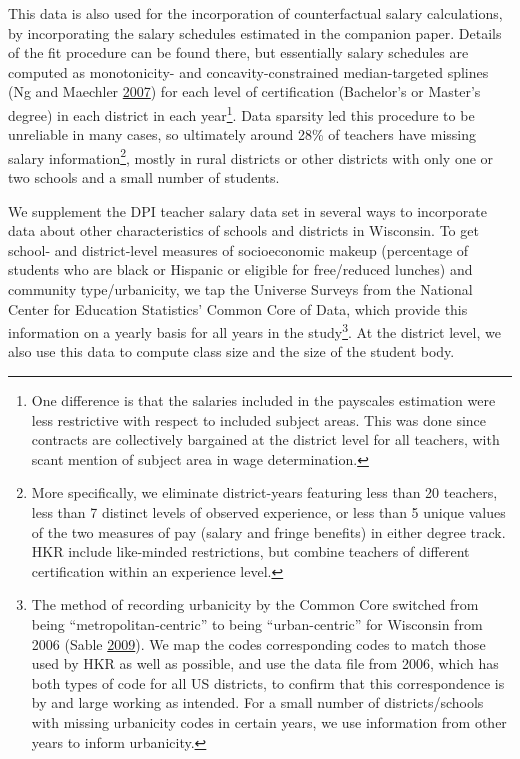 \documentclass[12pt,]{article}
\let\rmarkdownfootnote\footnote%
\def\footnote{\protect\rmarkdownfootnote}
\begin{document}
This data is also used for the incorporation of counterfactual salary
calculations, by incorporating the salary schedules estimated in the
companion paper. Details of the fit procedure can be found there, but
essentially salary schedules are computed as monotonicity- and
concavity-constrained median-targeted splines (Ng and Maechler
\protect\hyperlink{ref-ng}{2007}) for each level of certification
(Bachelor's or Master's degree) in each district in each year\footnote{One
  difference is that the salaries included in the payscales estimation
  were less restrictive with respect to included subject areas. This was
  done since contracts are collectively bargained at the district level
  for all teachers, with scant mention of subject area in wage
  determination.}. Data sparsity led this procedure to be unreliable in
many cases, so ultimately around 28\% of teachers have missing salary
information\footnote{More specifically, we eliminate district-years
  featuring less than 20 teachers, less than 7 distinct levels of
  observed experience, or less than 5 unique values of the two measures
  of pay (salary and fringe benefits) in either degree track. HKR
  include like-minded restrictions, but combine teachers of different
  certification within an experience level.}, mostly in rural districts
or other districts with only one or two schools and a small number of
students.

We supplement the DPI teacher salary data set in several ways to
incorporate data about other characteristics of schools and districts in
Wisconsin. To get school- and district-level measures of socioeconomic
makeup (percentage of students who are black or Hispanic or eligible for
free/reduced lunches) and community type/urbanicity, we tap the Universe
Surveys from the National Center for Education Statistics' Common Core
of Data, which provide this information on a yearly basis for all years
in the study\footnote{The method of recording urbanicity by the Common
  Core switched from being ``metropolitan-centric'' to being
  ``urban-centric'' for Wisconsin from 2006 (Sable
  \protect\hyperlink{ref-sable}{2009}). We map the codes corresponding
  codes to match those used by HKR as well as possible, and use the data
  file from 2006, which has both types of code for all US districts, to
  confirm that this correspondence is by and large working as intended.
  For a small number of districts/schools with missing urbanicity codes
  in certain years, we use information from other years to inform
  urbanicity.}. At the district level, we also use this data to compute
class size and the size of the student body.
\end{document}
